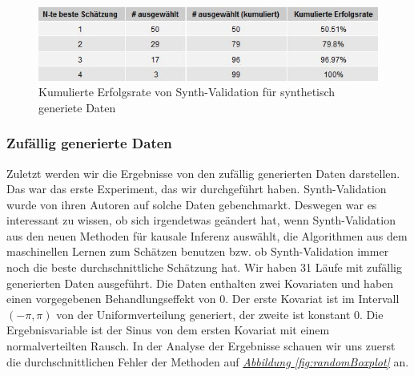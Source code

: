 \documentclass[12pt,a4paper,twoside]{scrartcl}
\numberwithin{equation}{section}
\newcommand{\reffig}[1]{\emph{\hyperref[#1]{Abbildung \ref*{#1}}}}
\begin{document}
\begin{center}
\begin{figure}[h]
    \centering
    \includegraphics[height=0.2\textwidth, width=1\textwidth]{figures/plots/generatedDataGrid.jpeg}
    \vspace{1mm}
    \caption[Kumulierte Erfolgsrate von Synth-Validation für synthetisch generiete Daten]{Kumulierte Erfolgsrate von Synth-Validation für synthetisch generiete Daten}\label{fig:generatedDataGrid}
  \end{figure}
\end{center}

\subsubsection{Zufällig generierte Daten}\label{subsubsec:ergebnisseZufälligGeneriertenDaten}
Zuletzt werden wir die Ergebnisse von den zufällig generierten Daten darstellen. Das war das erste Experiment, das wir durchgeführt haben. Synth-Validation wurde von ihren Autoren auf solche Daten gebenchmarkt. Deswegen war es interessant zu wissen, ob sich irgendetwas geändert hat, wenn Synth-Validation aus den neuen Methoden für kausale Inferenz auswählt, die Algorithmen aus dem maschinellen Lernen zum Schätzen benutzen bzw. ob Synth-Validation immer noch die beste durchschnittliche Schätzung hat. Wir haben 31 Läufe mit zufällig generierten Daten ausgeführt. Die Daten enthalten zwei Kovariaten und haben einen vorgegebenen Behandlungseffekt von 0. Der erste Kovariat ist im Intervall $(- \pi,\pi )$ von der Uniformverteilung generiert, der zweite ist konstant 0. Die Ergebnisvariable ist der Sinus von dem ersten Kovariat mit einem normalverteilten Rausch. In der Analyse der Ergebnisse schauen wir uns zuerst die durchschnittlichen Fehler der Methoden auf \reffig{fig:randomBoxplot} an. 
\end{document}
